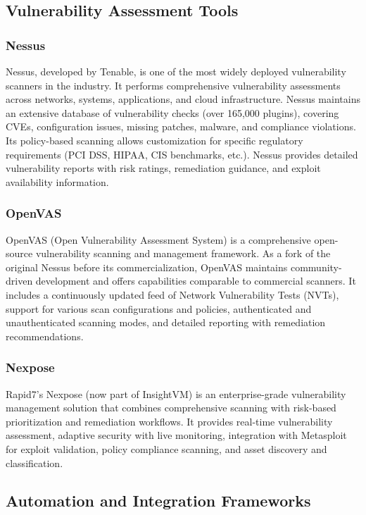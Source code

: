\subsection{Vulnerability Assessment Tools}

\subsubsection{Nessus}
Nessus, developed by Tenable, is one of the most widely deployed vulnerability scanners in the industry. It performs comprehensive vulnerability assessments across networks, systems, applications, and cloud infrastructure. Nessus maintains an extensive database of vulnerability checks (over 165,000 plugins), covering CVEs, configuration issues, missing patches, malware, and compliance violations. Its policy-based scanning allows customization for specific regulatory requirements (PCI DSS, HIPAA, CIS benchmarks, etc.). Nessus provides detailed vulnerability reports with risk ratings, remediation guidance, and exploit availability information.

\subsubsection{OpenVAS}
OpenVAS (Open Vulnerability Assessment System) is a comprehensive open-source vulnerability scanning and management framework. As a fork of the original Nessus before its commercialization, OpenVAS maintains community-driven development and offers capabilities comparable to commercial scanners. It includes a continuously updated feed of Network Vulnerability Tests (NVTs), support for various scan configurations and policies, authenticated and unauthenticated scanning modes, and detailed reporting with remediation recommendations.

\subsubsection{Nexpose}
Rapid7's Nexpose (now part of InsightVM) is an enterprise-grade vulnerability management solution that combines comprehensive scanning with risk-based prioritization and remediation workflows. It provides real-time vulnerability assessment, adaptive security with live monitoring, integration with Metasploit for exploit validation, policy compliance scanning, and asset discovery and classification.

\subsection{Automation and Integration Frameworks}

